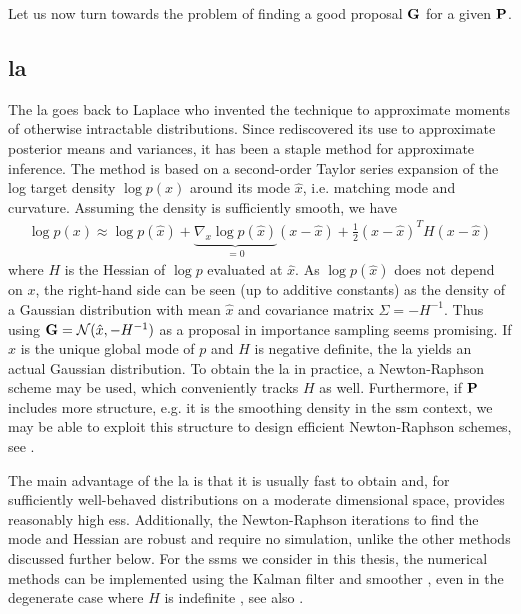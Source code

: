 Let us now turn towards the problem of finding a good proposal $\G$ for a given $\P$. 

\subsection{\texorpdfstring{\Acrfull{la}}{Laplace approximation}}
\label{subsec:la}

The \acrfull{la} goes back to Laplace \citep{Laplace1986Memoir} who invented the technique to approximate moments of otherwise intractable distributions. Since \citep{Tierney1986Accurate,Tierney1989Fully} rediscovered its use to approximate posterior means and variances, it has been a staple method for approximate inference.
The method is based on a second-order Taylor series expansion of the log target density $\log p(x)$ around its mode $\hat x$, i.e. matching mode and curvature. Assuming the density is sufficiently smooth, we have
\begin{align}
    \label{eq:LA_approximation}
\log p(x) \approx \log p(\hat x) + \underbrace{\nabla_{x} \log p (\hat x)}_{= 0} \left( x - \hat x \right) + \frac{1}{2} (x - \hat x)^{T} H (x - \hat x)
\end{align}
where $H$ is the Hessian of $\log p$ evaluated at $\hat x$. As $\log p (\hat x)$ does not depend on $x$, the right-hand side can be seen (up to additive constants) as the density of a Gaussian distribution with mean $\hat x$ and covariance matrix $\Sigma = - H^{-1}$. Thus using $\G = \mathcal N (\hat x, -H^{-1})$ as a proposal in importance sampling seems promising. 
If $\hat x$ is the unique global mode of $p$ and $H$ is negative definite, the \gls{la} yields an actual Gaussian distribution. 
To obtain the \gls{la} in practice, a Newton-Raphson scheme may be used, which conveniently tracks $H$ as well. Furthermore, if $\P$ includes more structure, e.g. it is the smoothing density in the \gls{ssm} context, we may be able to exploit this structure to design efficient Newton-Raphson schemes, see .

The main advantage of the \gls{la} is that it is usually fast to obtain and, for sufficiently well-behaved distributions on a moderate dimensional space, provides reasonably high \gls{ess}. Additionally, the Newton-Raphson iterations to find the mode and Hessian are robust and require no simulation, unlike the other methods discussed further below.
For the \glspl{ssm} we consider in this thesis, the numerical methods can be implemented using the Kalman filter and smoother \citep{Shephard1997Likelihood,Durbin1997Monte}, even in the degenerate case where $H$ is indefinite \citep{Jungbacker2007Monte}, see also .

